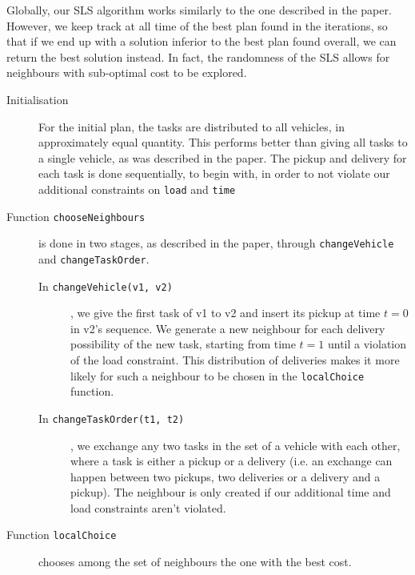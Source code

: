 \documentclass[12pt,a4paper]{article}
\begin{document}
Globally, our SLS algorithm works similarly to the one described in the paper. However, we keep track at all time of the best plan found in the iterations, so that if we end up with a solution inferior to the best plan found overall, we can return the best solution instead. In fact, the randomness of the SLS allows for neighbours with sub-optimal cost to be explored.

\begin{description}
\item[Initialisation] For the initial plan, the tasks are distributed to all vehicles, in approximately equal quantity. This performs better than giving all tasks to a single vehicle, as was described in the paper. The pickup and delivery for each task is done sequentially, to begin with, in order to not violate our additional constraints on \texttt{load} and \texttt{time}
\item[Function \texttt{chooseNeighbours}] is done in two stages, as described in the paper, through \texttt{changeVehicle} and \texttt{changeTaskOrder}. 
\begin{description}
\item[In \texttt{changeVehicle(v1, v2)}], we give the first task of v1 to v2 and insert its pickup at time $t = 0$ in v2's sequence. We generate a new neighbour for each delivery possibility of the new task, starting from time $t = 1$ until a violation of the load constraint. This distribution of deliveries makes it more likely for such a neighbour to be chosen in the \texttt{localChoice} function.
\item[In \texttt{changeTaskOrder(t1, t2)}], we exchange any two tasks in the set of a vehicle with each other, where a task is either a pickup or a delivery (i.e. an exchange can happen between two pickups, two deliveries or a delivery and  a pickup). The neighbour is only created if our additional time and load constraints aren't violated.
\end{description}
\item[Function \texttt{localChoice}] chooses among the set of neighbours the one with the best cost.
\end{description}
\end{document}
